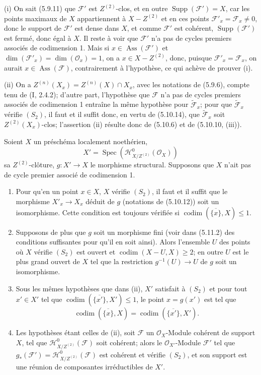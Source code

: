 (i) On sait (5.9.11) que $\mathcal F'$ est $Z^{(2)}$-clos, et en outre
$\operatorname{Supp}(\mathcal F')=X$, car les points maximaux de $X$
appartiennent à $X-Z^{(2)}$ et en ces points
$\mathcal F'_x=\mathcal F_x\neq0$, donc le support de $\mathcal F'$ est dense
dans $X$, et comme $\mathcal F'$ est cohérent,
$\operatorname{Supp}(\mathcal F')$ est fermé, donc égal à $X$. Il reste à voir
que $\mathcal F'$ n'a pas de cycles premiers associés de codimension 1. Mais
si $x\in\operatorname{Ass}(\mathcal F')$ et
$\dim(\mathcal F'_x)=\dim(\mathcal O_x)=1$, on a $x\in X-Z^{(2)}$, donc,
puisque $\mathcal F'_x=\mathcal F_x$, on aurait
$x\in\operatorname{Ass}(\mathcal F)$, contrairement à l'hypothèse, ce qui
achève de prouver (i).

(ii) On a $Z^{(n)}(X_x)=Z^{(n)}(X)\cap X_x$, avec les notations de (5.9.6),
compte tenu de (I, 2.4.2); d'autre part, l'hypothèse que $\mathcal F$ n'a pas
de cycles premiers associés de codimension 1 entraîne la même hypothèse pour
$\widetilde{\mathcal F}_x$; pour que $\widetilde{\mathcal F}_x$ vérifie
$(S_2)$, il faut et il suffit donc, en vertu de (5.10.14), que
$\widetilde{\mathcal F}_x$ soit $Z^{(2)}(X_x)$-clos; l'assertion (ii) résulte
donc de (5.10.6) et de (5.10.10, (iii)).

\begin{proposition}[5.10.16]
\label{IV.2.s5.10.16-fr}
Soient $X$ un préschéma localement noethérien,
\[
X'=\operatorname{Spec}(\mathcal H^0_{X/Z^{(2)}}(\mathcal O_X))
\]
sa $Z^{(2)}$-clôture, $g:X'\to X$ le morphisme structural. Supposons que $X$
n'ait pas de cycle premier associé de codimension 1.
\begin{enumerate}
\item[(i)] Pour qu'en un point $x\in X$, $X$ vérifie $(S_2)$, il faut et il
suffit que le morphisme $X'_x\to X_x$ déduit de $g$ (notations de (5.10.12))
soit un isomorphisme. Cette condition est toujours vérifiée si
$\operatorname{codim}(\overline{\{x\}},X)\leq1$.
\item[(ii)] Supposons de plus que $g$ soit un morphisme fini (voir dans
(5.11.2) des conditions suffisantes pour qu'il en soit ainsi). Alors
l'ensemble $U$ des points où $X$ vérifie $(S_2)$ est ouvert et
$\operatorname{codim}(X-U,X)\geq2$; en outre $U$ est le plus grand ouvert de
$X$ tel que la restriction $g^{-1}(U)\to U$ de $g$ soit un isomorphisme.
\item[(iii)] Sous les mêmes hypothèses que dans (ii), $X'$ satisfait à $(S_2)$
et pour tout $x'\in X'$ tel que\linebreak
$\operatorname{codim}(\overline{\{x'\}},X')\leq1$, le point $x=g(x')$ est tel
que
\[
\operatorname{codim}(\overline{\{x\}},X)
=\operatorname{codim}(\overline{\{x'\}},X').
\]
\item[(iv)] Les hypothèses étant celles de (ii), soit $\mathcal F$ un
$\mathcal O_X$-Module cohérent de support $X$, tel que
$\mathcal H^0_{X/Z^{(2)}}(\mathcal F)$ soit cohérent; alors le
$\mathcal O_{X'}$-Module $\mathcal F'$ tel que
$g_*(\mathcal F')=\mathcal H^0_{X/Z^{(2)}}(\mathcal F)$ est cohérent et
vérifie $(S_2)$, et son support est une réunion de composantes irréductibles de
$X'$.
\end{enumerate}
\end{proposition}

